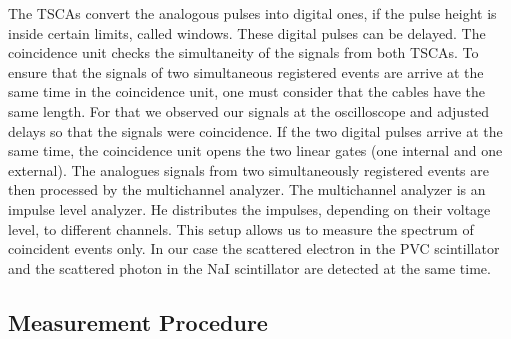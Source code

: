 

The TSCAs convert the analogous pulses into digital ones, if the pulse height is
inside certain limits, called windows. These digital pulses can be delayed.
The coincidence unit checks the simultaneity of the signals from both
TSCAs. 
To ensure that the signals of two simultaneous registered events are arrive
at the same time in the coincidence unit, one must consider
that the cables have the same length. For that we observed our signals at
the oscilloscope and adjusted delays so that the signals were
coincidence.
If the two digital pulses arrive at the same time, the coincidence unit
opens the two linear gates (one internal and one external). The analogues
signals from two simultaneously registered events are then processed by the
multichannel analyzer. The multichannel analyzer is an impulse level
analyzer. He distributes the
impulses, depending on their voltage level, to different channels.
This setup allows us to measure the spectrum of coincident events only. In
our case the scattered electron in the PVC scintillator and the scattered
photon in the NaI scintillator are detected at the same time. 


\subsection{Measurement Procedure}

